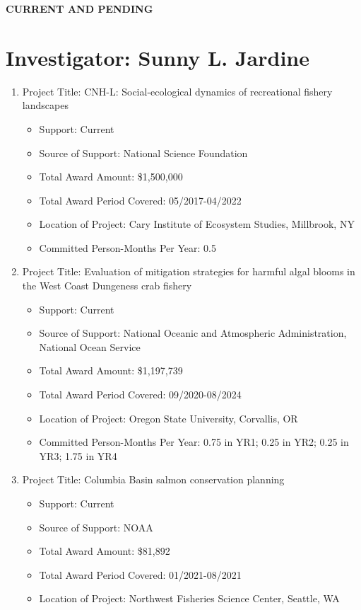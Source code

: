 \documentclass[12pt]{elsarticle}
\begin{document}
\begin{center} \textbf{CURRENT AND PENDING} \end{center}

\section*{Investigator: Sunny L. Jardine}

\begin{enumerate}
\item Project Title: CNH-L: Social-ecological dynamics of recreational fishery landscapes
\begin{itemize}
\item Support: Current
\item Source of Support: National Science Foundation
\item Total Award Amount: \$1,500,000
\item Total Award Period Covered: 05/2017-04/2022
\item Location of Project: Cary Institute of Ecosystem Studies, Millbrook, NY
\item Committed Person-Months Per Year: 0.5
\end{itemize}
\item Project Title: Evaluation of mitigation strategies for harmful algal blooms in the West Coast Dungeness crab fishery
\begin{itemize}
\item Support: Current
\item Source of Support: National Oceanic and Atmospheric Administration, National Ocean Service
\item Total Award Amount: \$1,197,739
\item Total Award Period Covered: 09/2020-08/2024
\item Location of Project: Oregon State University, Corvallis, OR
\item Committed Person-Months Per Year: 0.75 in YR1; 0.25 in YR2; 0.25 in YR3; 1.75 in YR4
\end{itemize}
\item Project Title: Columbia Basin salmon conservation planning
\begin{itemize}
\item Support: Current
\item Source of Support: NOAA
\item Total Award Amount: \$81,892
\item Total Award Period Covered: 01/2021-08/2021
\item Location of Project: Northwest Fisheries Science Center, Seattle, WA

\end{itemize}
\end{enumerate}
\end{document}
